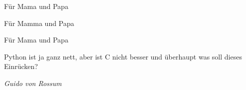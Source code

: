 \thispagestyle{empty}
\null{}\vfill

\begin{center}
  \begin{minipage}{.7\columnwidth}
   Für Mama und Papa
  \end{minipage}
  
  \vspace{3ex}
  
  \hspace{10ex}\begin{minipage}{.7\columnwidth}
   Für Mamma und Papa
  \end{minipage}
  
  \vspace{3ex}
  
  \hspace{4ex}\begin{minipage}{.7\columnwidth}
   Für Mama und Papa
  \end{minipage}
\end{center}
\vfill

\newpage

\thispagestyle{empty}
\null{}\vfill
\begin{center}
  \begin{minipage}{.7\columnwidth}
    Python ist ja ganz nett, aber ist C nicht besser und überhaupt was soll dieses Einrücken?
    
    \vspace{5ex}

    \raggedleft
    \emph{Guido von Rossum}
  \end{minipage}
\end{center}
\vfill
